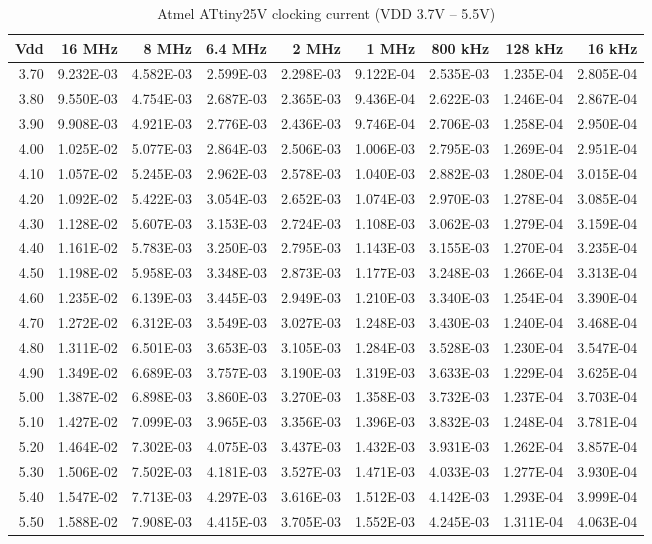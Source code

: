 \begin{table}
\begin{centering}
\begin{tabular}{|r|r|r|r|r|r|r|r|r|}
\hline
Vdd  & 16 MHz  & 8 MHz  & 6.4 MHz  & 2 MHz  & 1 MHz  & 800 kHz  & 128 kHz  & 16 kHz \tabularnewline
\hline
3.70  & 9.232E-03  & 4.582E-03  & 2.599E-03  & 2.298E-03  & 9.122E-04  & 2.535E-03  & 1.235E-04  & 2.805E-04 \tabularnewline
3.80  & 9.550E-03  & 4.754E-03  & 2.687E-03  & 2.365E-03  & 9.436E-04  & 2.622E-03  & 1.246E-04  & 2.867E-04 \tabularnewline
3.90  & 9.908E-03  & 4.921E-03  & 2.776E-03  & 2.436E-03  & 9.746E-04  & 2.706E-03  & 1.258E-04  & 2.950E-04 \tabularnewline
4.00  & 1.025E-02  & 5.077E-03  & 2.864E-03  & 2.506E-03  & 1.006E-03  & 2.795E-03  & 1.269E-04  & 2.951E-04 \tabularnewline
4.10  & 1.057E-02  & 5.245E-03  & 2.962E-03  & 2.578E-03  & 1.040E-03  & 2.882E-03  & 1.280E-04  & 3.015E-04 \tabularnewline
4.20  & 1.092E-02  & 5.422E-03  & 3.054E-03  & 2.652E-03  & 1.074E-03  & 2.970E-03  & 1.278E-04  & 3.085E-04 \tabularnewline
4.30  & 1.128E-02  & 5.607E-03  & 3.153E-03  & 2.724E-03  & 1.108E-03  & 3.062E-03  & 1.279E-04  & 3.159E-04 \tabularnewline
4.40  & 1.161E-02  & 5.783E-03  & 3.250E-03  & 2.795E-03  & 1.143E-03  & 3.155E-03  & 1.270E-04  & 3.235E-04 \tabularnewline
4.50  & 1.198E-02  & 5.958E-03  & 3.348E-03  & 2.873E-03  & 1.177E-03  & 3.248E-03  & 1.266E-04  & 3.313E-04 \tabularnewline
4.60  & 1.235E-02  & 6.139E-03  & 3.445E-03  & 2.949E-03  & 1.210E-03  & 3.340E-03  & 1.254E-04  & 3.390E-04 \tabularnewline
4.70  & 1.272E-02  & 6.312E-03  & 3.549E-03  & 3.027E-03  & 1.248E-03  & 3.430E-03  & 1.240E-04  & 3.468E-04 \tabularnewline
4.80  & 1.311E-02  & 6.501E-03  & 3.653E-03  & 3.105E-03  & 1.284E-03  & 3.528E-03  & 1.230E-04  & 3.547E-04 \tabularnewline
4.90  & 1.349E-02  & 6.689E-03  & 3.757E-03  & 3.190E-03  & 1.319E-03  & 3.633E-03  & 1.229E-04  & 3.625E-04 \tabularnewline
5.00  & 1.387E-02  & 6.898E-03  & 3.860E-03  & 3.270E-03  & 1.358E-03  & 3.732E-03  & 1.237E-04  & 3.703E-04 \tabularnewline
5.10  & 1.427E-02  & 7.099E-03  & 3.965E-03  & 3.356E-03  & 1.396E-03  & 3.832E-03  & 1.248E-04  & 3.781E-04 \tabularnewline
5.20  & 1.464E-02  & 7.302E-03  & 4.075E-03  & 3.437E-03  & 1.432E-03  & 3.931E-03  & 1.262E-04  & 3.857E-04 \tabularnewline
5.30  & 1.506E-02  & 7.502E-03  & 4.181E-03  & 3.527E-03  & 1.471E-03  & 4.033E-03  & 1.277E-04  & 3.930E-04 \tabularnewline
5.40  & 1.547E-02  & 7.713E-03  & 4.297E-03  & 3.616E-03  & 1.512E-03  & 4.142E-03  & 1.293E-04  & 3.999E-04 \tabularnewline
5.50  & 1.588E-02  & 7.908E-03  & 4.415E-03  & 3.705E-03  & 1.552E-03  & 4.245E-03  & 1.311E-04  & 4.063E-04 \tabularnewline
\hline
\end{tabular}
\par\end{centering}
\caption{Atmel ATtiny25V clocking current (VDD 3.7V -- 5.5V)}
\end{table}


